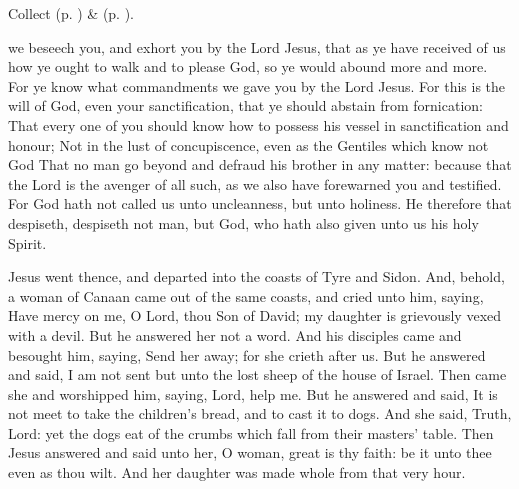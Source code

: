 \begin{rubric}
     Collect  (p. \pageref{AshWednesdayMassCollect}) \&   (p. \pageref{SPLivingDeparted}).
\end{rubric}

\vspace{-0.4\baselineskip}


\vspace{-0.2\baselineskip}

 we beseech you, and exhort you by the Lord Jesus, that as ye have received of us how ye ought to walk and to please God, so ye would abound more and more. For ye know what commandments we gave you by the Lord Jesus. For this is the will of God, even your sanctification, that ye should abstain from fornication: That every one of you should know how to possess his vessel in sanctification and honour; Not in the lust of concupiscence, even as the Gentiles which know not God That no man go beyond and defraud his brother in any matter: because that the Lord is the avenger of all such, as we also have forewarned you and testified. For God hath not called us unto uncleanness, but unto holiness. He therefore that despiseth, despiseth not man, but God, who hath also given unto us his holy Spirit.


 Jesus went thence, and departed into the coasts of Tyre and Sidon. And, behold, a woman of Canaan came out of the same coasts, and cried unto him, saying, Have mercy on me, O Lord, thou Son of David; my daughter is grievously vexed with a devil. But he answered her not a word. And his disciples came and besought him, saying, Send her away; for she crieth after us. But he answered and said, I am not sent but unto the lost sheep of the house of Israel. Then came she and worshipped him, saying, Lord, help me. But he answered and said, It is not meet to take the children's bread, and to cast it to dogs. And she said, Truth, Lord: yet the dogs eat of the crumbs which fall from their masters' table. Then Jesus answered and said unto her, O woman, great is thy faith: be it unto thee even as thou wilt. And her daughter was made whole from that very hour.

